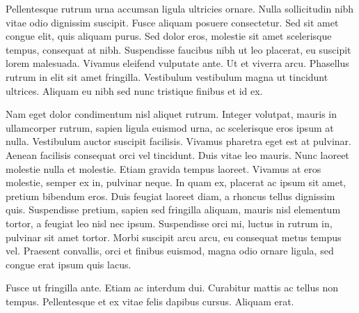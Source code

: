 Pellentesque rutrum urna accumsan ligula ultricies ornare. Nulla sollicitudin nibh vitae odio dignissim suscipit. Fusce aliquam posuere consectetur. Sed sit amet congue elit, quis aliquam purus. Sed dolor eros, molestie sit amet scelerisque tempus, consequat at nibh. Suspendisse faucibus nibh ut leo placerat, eu suscipit lorem malesuada. Vivamus eleifend vulputate ante. Ut et viverra arcu. Phasellus rutrum in elit sit amet fringilla. Vestibulum vestibulum magna ut tincidunt ultrices. Aliquam eu nibh sed nunc tristique finibus et id ex.

Nam eget dolor condimentum nisl aliquet rutrum. Integer volutpat, mauris in ullamcorper rutrum, sapien ligula euismod urna, ac scelerisque eros ipsum at nulla. Vestibulum auctor suscipit facilisis. Vivamus pharetra eget est at pulvinar. Aenean facilisis consequat orci vel tincidunt. Duis vitae leo mauris. Nunc laoreet molestie nulla et molestie. Etiam gravida tempus laoreet. Vivamus at eros molestie, semper ex in, pulvinar neque. In quam ex, placerat ac ipsum sit amet, pretium bibendum eros. Duis feugiat laoreet diam, a rhoncus tellus dignissim quis. Suspendisse pretium, sapien sed fringilla aliquam, mauris nisl elementum tortor, a feugiat leo nisl nec ipsum. Suspendisse orci mi, luctus in rutrum in, pulvinar sit amet tortor. Morbi suscipit arcu arcu, eu consequat metus tempus vel. Praesent convallis, orci et finibus euismod, magna odio ornare ligula, sed congue erat ipsum quis lacus.

Fusce ut fringilla ante. Etiam ac interdum dui. Curabitur mattis ac tellus non tempus. Pellentesque et ex vitae felis dapibus cursus. Aliquam erat.